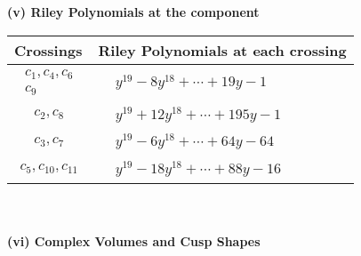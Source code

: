 \documentclass[1p]{elsarticle_modified}
\theoremstyle{definition}
\begin{document}
\newpage\renewcommand{\arraystretch}{1}
\flushleft \textbf{(v) Riley Polynomials at the component}\newline \\
\begin{tabular}{m{50pt}|m{274pt}}
Crossings & \hspace{64pt}Riley Polynomials at each crossing \\
\hline $$\begin{aligned}c_{1},c_{4},c_{6}\\c_{9}\end{aligned}$$&$\begin{aligned}
&y^{19}-8 y^{18}+\cdots+19 y-1
\end{aligned}$\\
\hline $$\begin{aligned}c_{2},c_{8}\end{aligned}$$&$\begin{aligned}
&y^{19}+12 y^{18}+\cdots+195 y-1
\end{aligned}$\\
\hline $$\begin{aligned}c_{3},c_{7}\end{aligned}$$&$\begin{aligned}
&y^{19}-6 y^{18}+\cdots+64 y-64
\end{aligned}$\\
\hline $$\begin{aligned}c_{5},c_{10},c_{11}\end{aligned}$$&$\begin{aligned}
&y^{19}-18 y^{18}+\cdots+88 y-16
\end{aligned}$\\
\hline
\end{tabular}\\~\\
\newpage\flushleft \textbf{(vi) Complex Volumes and Cusp Shapes}
\end{document}

